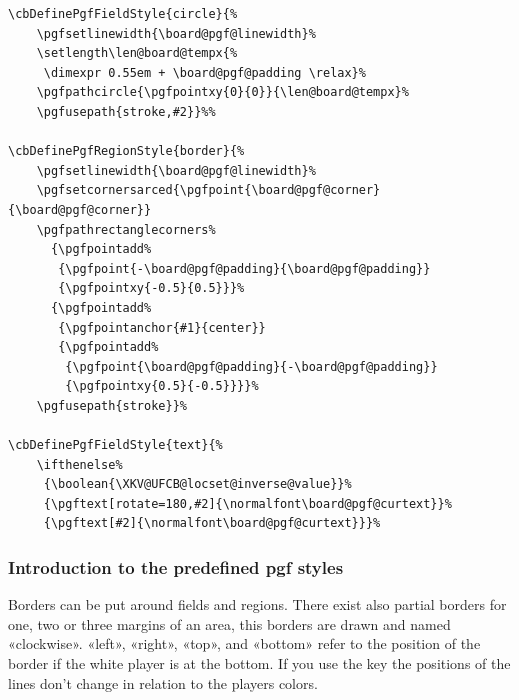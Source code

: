 \documentclass[pagesize,parskip=half-,fontsize=12pt]{scrartcl}
\makeatletter
\newcommand\Describefillkey[4][]{\par\index{#2}%
\makebox[0pt][r]{\scriptsize #1\hspace{1em}}%
 \colorbox{green!25}{\makebox[\dimexpr\textwidth-2\fboxsep\relax]{\ttfamily%
    \eqparbox{fillkey}{#2=\meta{#3}}\hfill
    \eqparbox{fillexample}{%
     \ifthenelse{\equal{#4}{}}%
     {#2}
     {#2={#4}}}}}%
    \par\nobreak\@afterheading}
\makeatother
\begin{document}
\begin{lstlisting}
\cbDefinePgfFieldStyle{circle}{%
    \pgfsetlinewidth{\board@pgf@linewidth}%
    \setlength\len@board@tempx{%
     \dimexpr 0.55em + \board@pgf@padding \relax}%
    \pgfpathcircle{\pgfpointxy{0}{0}}{\len@board@tempx}%
    \pgfusepath{stroke,#2}}%%

\cbDefinePgfRegionStyle{border}{%
    \pgfsetlinewidth{\board@pgf@linewidth}%
    \pgfsetcornersarced{\pgfpoint{\board@pgf@corner}{\board@pgf@corner}}
    \pgfpathrectanglecorners%
      {\pgfpointadd%
       {\pgfpoint{-\board@pgf@padding}{\board@pgf@padding}}
       {\pgfpointxy{-0.5}{0.5}}}%
      {\pgfpointadd%
       {\pgfpointanchor{#1}{center}}
       {\pgfpointadd%
        {\pgfpoint{\board@pgf@padding}{-\board@pgf@padding}}
        {\pgfpointxy{0.5}{-0.5}}}}%
    \pgfusepath{stroke}}%

\cbDefinePgfFieldStyle{text}{%
    \ifthenelse%
     {\boolean{\XKV@UFCB@locset@inverse@value}}%
     {\pgftext[rotate=180,#2]{\normalfont\board@pgf@curtext}}%
     {\pgftext[#2]{\normalfont\board@pgf@curtext}}}%
\end{lstlisting}

\subsubsection{Introduction to the predefined pgf styles}

%



%
%
%
%
%
%
%
%
%
%
%
%
%
Borders can be put around fields and regions. There exist also
partial borders for one, two or three margins of an area, this
borders are drawn and named «clockwise». «left», «right», «top», and
«bottom» refer to the position of the border if the white player is
at the bottom. If you use the key
 the positions of the lines don't change in relation to
the players colors.
\end{document}
